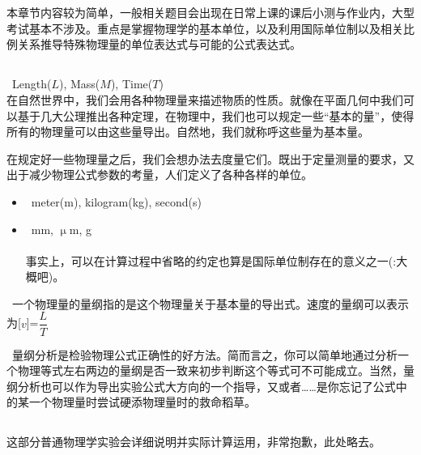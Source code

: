 \begin{comment}
\documentclass{Physics_H_Notes}
\usepackage{upgreek}

\end{comment}
	\chapter[测量]{}
	本章节内容较为简单，一般相关题目会出现在日常上课的课后小测与作业内，大型考试基本不涉及。重点是掌握物理学的基本单位，以及利用国际单位制以及相关比例关系推导特殊物理量的单位表达式与可能的公式表达式。
	\section[单位与量纲]{}
	\begin{Itemize}
		\item {}\ \eg Length($L$), Mass($M$), Time($T$)\\
		在自然世界中，我们会用各种物理量来描述物质的性质。就像在平面几何中我们可以基于几大公理推出各种定理，在物理中，我们也可以规定一些“基本的量”，使得所有的物理量可以由这些量导出。自然地，我们就称呼这些量为基本量。
		\item {}在规定好一些物理量之后，我们会想办法去度量它们。既出于定量测量的要求，又出于减少物理公式参数的考量，人们定义了各种各样的单位。
		\begin{itemize}
			\item {}\footnotemark\ \eg meter(m), kilogram(kg), second(s)
			\item {}\ \eg mm, $\upmu$m, g\\
			\\
			事实上，可以在计算过程中省略的约定也算是国际单位制存在的意义之一(\dove :大概吧)。
		\end{itemize}
		\item {}\ 一个物理量的量纲指的是这个物理量关于基本量的导出式。\eg 速度的量纲可以表示为[$v$]=$\dfrac{L}{T}$
		\item {}\ 量纲分析是检验物理公式正确性的好方法。简而言之，你可以简单地通过分析一个物理等式左右两边的量纲是否一致来初步判断这个等式可不可能成立。当然，量纲分析也可以作为导出实验公式大方向的一个指导，又或者……是你忘记了公式中的某一个物理量时尝试硬添物理量时的救命稻草。
	\end{Itemize}
	\section[数据处理]{}
	这部分普通物理学实验会详细说明并实际计算运用，非常抱歉，此处略去。
%